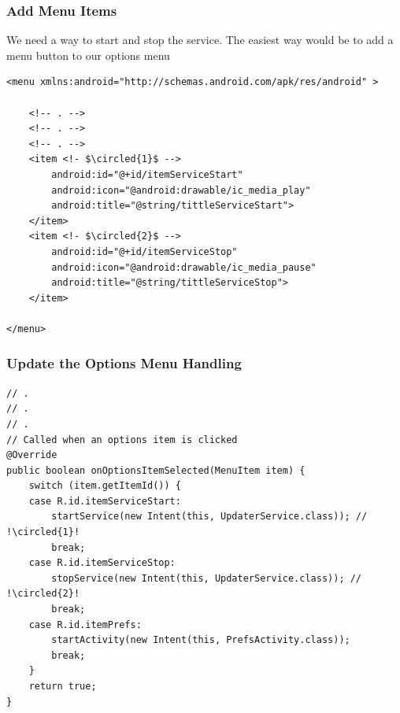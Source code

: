 \begin{frame}
\frametitle{Add Menu Items}
We need a way to start and stop the service.
The easiest way would be to add a menu button to our options menu 
\lstset{language=XML, style=eclipse,breaklines=true, tabsize=2}
\begin{lstlisting}[caption=res/menu/status.xml, basicstyle=\tiny,escapechar=$]
<menu xmlns:android="http://schemas.android.com/apk/res/android" >

    <!-- . -->
    <!-- . -->
    <!-- . -->
    <item <!- $\circled{1}$ -->
        android:id="@+id/itemServiceStart"
        android:icon="@android:drawable/ic_media_play"
        android:title="@string/tittleServiceStart">
    </item>
    <item <!- $\circled{2}$ -->
        android:id="@+id/itemServiceStop"
        android:icon="@android:drawable/ic_media_pause"
        android:title="@string/tittleServiceStop">
    </item>

</menu>
\end{lstlisting}
\end{frame}
\begin{frame}
\frametitle{Update the Options Menu Handling}
\lstset{language=java, style=eclipse, breaklines=true, tabsize=2}
\begin{lstlisting}[caption=src/com/artemisa/yamba/StatusActiviy.java, basicstyle=\tiny,escapechar=!]
// .
// .
// .
// Called when an options item is clicked
@Override
public boolean onOptionsItemSelected(MenuItem item) {
	switch (item.getItemId()) {
	case R.id.itemServiceStart:
		startService(new Intent(this, UpdaterService.class)); // !\circled{1}!
		break;
	case R.id.itemServiceStop:
		stopService(new Intent(this, UpdaterService.class)); //  !\circled{2}!
		break;
	case R.id.itemPrefs:
		startActivity(new Intent(this, PrefsActivity.class));
		break;
	}
	return true;
}
\end{lstlisting}
\end{frame}

